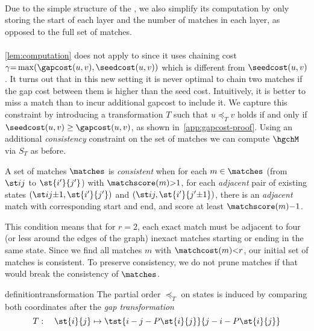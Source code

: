 \paragraph{\SH} Due to the simple structure of the \sh, we also simplify its
computation by only storing the start of each layer and the number of matches in
each layer, as opposed to the full set of matches.

\paragraph{\GCH}
\cref{lem:computation} does not apply to \gch since it uses chaining cost
$\gamma{=}\max(\gapcost(u, v), \seedcost(u,v))$ which is different from
$\seedcost(u,v)$. It turns out that in this new setting it is never optimal to chain
two matches if the gap cost between them is higher than the seed cost.
Intuitively, it is better to miss a match than to incur additional gapcost to
include it. We capture this constraint by introducing a transformation $T$ such
that $u\preceq_T v$ holds if and only if $\seedcost(u,v) \geq \gapcost(u,v)$, as
shown in~\cref{app:gapcost-proof}. Using an additional \emph{consistency}
constraint on the set of matches we can compute $\hgchM$ via $S_T$ as before.

\begin{definition}\label{dfn:consistent} %
  A set of matches $\matches$ is \emph{consistent} when for each $m\in\matches$
  (from $\st ij$ to $\st {i'}{j'}$) with $\matchscore(m) {>} 1$, for each
  \emph{adjacent} pair of existing states $(\st i{j{\pm}1}, \st{i'}{j'})$ and
  $(\st ij, \st {i'}{j'{\pm}1})$, there is an \emph{adjacent} match with corresponding start and
  end, and score at least $\matchscore(m){-}1$.
\end{definition}
This condition means that for $r{=}2$, each exact match must be adjacent to four
(or less around the edges of the graph) inexact matches starting or ending in
the same state. Since we find all matches $m$ with $\matchcost(m){<}r$, our initial set
of matches is consistent. To preserve consistency, we do not prune matches if
that would break the consistency of $\matches$.

\begin{restatable}{definition}{transformation}\label{dfn:transformation} %
  The partial order $\preceq_T$ on states is induced by comparing both
  coordinates after the \emph{gap transformation}
\begin{equation*}
  T: \quad\st{i}{j}\mapsto \tst{i - j - P\st{i}{j}}{j-i-P\st{i}{j}}
\end{equation*}
\end{restatable}

